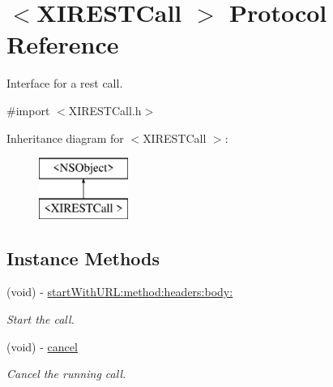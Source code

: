 \hypertarget{protocol_x_i_r_e_s_t_call_01-p}{}\section{$<$X\+I\+R\+E\+S\+T\+Call $>$ Protocol Reference}
\label{protocol_x_i_r_e_s_t_call_01-p}


Interface for a rest call.  




{\ttfamily \#import $<$X\+I\+R\+E\+S\+T\+Call.\+h$>$}

Inheritance diagram for $<$X\+I\+R\+E\+S\+T\+Call $>$\+:\begin{figure}[H]
\begin{center}
\leavevmode
\includegraphics[height=2.000000cm]{protocol_x_i_r_e_s_t_call_01-p}
\end{center}
\end{figure}
\subsection*{Instance Methods}
\begin{DoxyCompactItemize}
\item 
(void) -\/ \hyperlink{protocol_x_i_r_e_s_t_call_01-p_a61381029d5b30a8edd8a5a8938ba332f}{start\+With\+U\+R\+L\+:method\+:headers\+:body\+:}
\begin{DoxyCompactList}\small\item\em Start the call. \end{DoxyCompactList}\item 
(void) -\/ \hyperlink{protocol_x_i_r_e_s_t_call_01-p_a78d1e5fe3f553d13bf0fcba0adb07b74}{cancel}
\begin{DoxyCompactList}\small\item\em Cancel the running call. \end{DoxyCompactList}\end{DoxyCompactItemize}
